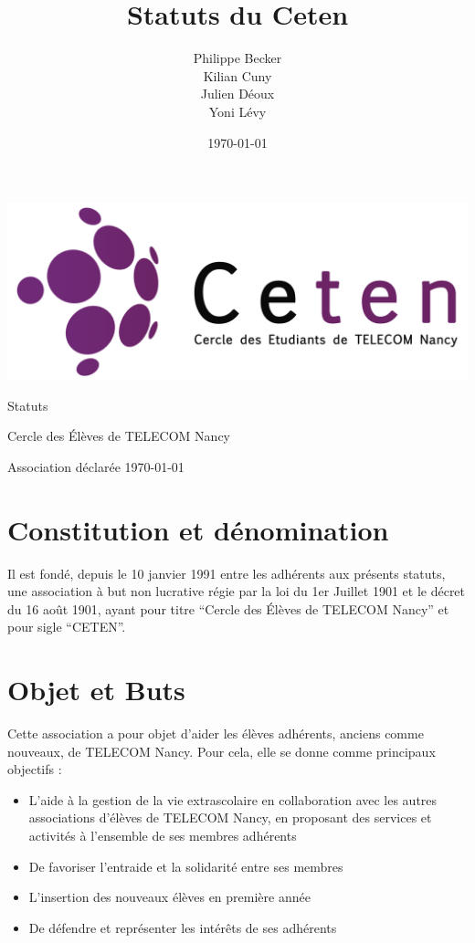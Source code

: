 \documentclass{article} %
\title{Statuts du Ceten}
\author{Philippe Becker\\
	Kilian Cuny\\
	Julien Déoux\\
	Yoni Lévy}
\date\today
\begin{document}

	
	\begin{titlepage}
		\begin{center}
			\includegraphics[width=\textwidth]{images/ceten.png}\par
			\vspace{3cm}
			{\Huge \light Statuts}\par
			\vfill
			{\large Cercle des Élèves de TELECOM Nancy}\par
			{\large \light Association déclarée}
			\vfill
			{\light \today}\par
		\end{center}
	\end{titlepage}

	\section{Constitution et dénomination}
		Il est fondé, depuis le 10 janvier 1991 entre les adhérents aux présents statuts,
		une association à but non lucrative régie par la loi du 1er Juillet 1901 et le
		décret du 16 août 1901, ayant pour titre “Cercle des Élèves de TELECOM Nancy” et pour sigle “CETEN”.

	\section{Objet et Buts}
		Cette association a pour objet d’aider les élèves adhérents, anciens comme nouveaux, de TELECOM Nancy. 
		Pour cela, elle se donne comme principaux objectifs :
		\begin{itemize}
			\item L’aide à la gestion de la vie extrascolaire en collaboration avec les autres associations
				d'élèves de TELECOM Nancy, en proposant des services et activités à l’ensemble de ses
				membres adhérents
			\item De favoriser l’entraide et la solidarité entre ses membres
			\item L’insertion des nouveaux élèves en première année
			\item De défendre et représenter les intérêts de ses adhérents
		\end{itemize}
\end{document}

